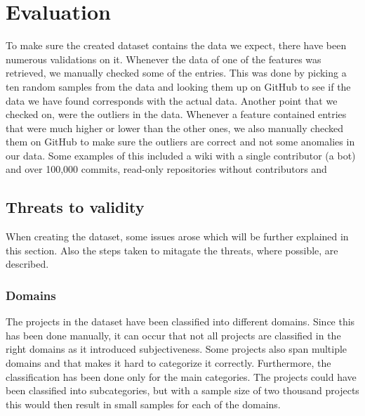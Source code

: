 \section{Evaluation}
To make sure the created dataset contains the data we expect, there have been numerous validations on it.
Whenever the data of one of the features was retrieved, we manually checked some of the entries.
This was done by picking a ten random samples from the data and looking them up on GitHub to see if the data we have found corresponds with the actual data.
Another point that we checked on, were the outliers in the data.
Whenever a feature contained entries that were much higher or lower than the other ones, we also manually checked them on GitHub to make sure the outliers are correct and not some anomalies in our data.
Some examples of this included a wiki with a single contributor (a bot) and over 100,000 commits, read-only repositories without contributors and 

\subsection{Threats to validity}
When creating the dataset, some issues arose which will be further explained in this section.
Also the steps taken to mitagate the threats, where possible, are described. \\

\subsubsection{Domains}
The projects in the dataset have been classified into different domains.
Since this has been done manually, it can occur that not all projects are classified in the right domains as it introduced subjectiveness.
Some projects also span multiple domains and that makes it hard to categorize it correctly.
Furthermore, the classification has been done only for the main categories.
The projects could have been classified into subcategories, but with a sample size of two thousand projects this would then result in small samples for each of the domains.
\\

